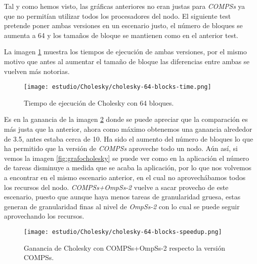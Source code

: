 \par\bigskip

Tal y como hemos visto, las gráficas anteriores no eran justas para \textit{COMPSs} ya que no permitían utilizar todos los procesadores del nodo. El siguiente test pretende poner ambas versiones en un escenario justo, el número de bloques se aumenta a 64 y los tamaños de bloque se mantienen como en el anterior test.
\par\bigskip

La imagen \ref{fig:cholesky-64-time} muestra los tiempos de ejecución de ambas versiones, por el mismo motivo que antes al aumentar el tamaño de bloque las diferencias entre ambas se vuelven más notorias.

\par\bigskip

\begin{figure}[H]
	\centering 
	\caption{Tiempo de ejecución de Cholesky con 64 bloques.}
	\texttt{[image: estudio/Cholesky/cholesky-64-blocks-time.png]}
	\label{fig:cholesky-64-time}
\end{figure}

Es en la ganancia de la imagen \ref{fig:cholesky-64-speedup} donde se puede apreciar que la comparación es más justa que la anterior, ahora como máximo obtenemos una ganancia alrededor de 3.5, antes estaba cerca de 10. Ha sido el aumento del número de bloques lo que ha permitido que la versión de \textit{COMPSs} aproveche todo un nodo. Aún así, si vemos la imagen \ref{fig:grafocholesky} se puede ver como en la aplicación el número de tareas disminuye a medida que se acaba la aplicación, por lo que nos volvemos a encontrar en el mismo escenario anterior, en el cual no aprovechábamos todos los recursos del nodo. \textit{COMPSs+OmpSs-2} vuelve a sacar provecho de este escenario, puesto que aunque haya menos tareas de granularidad gruesa, estas generan de granularidad finas al nivel de \textit{OmpSs-2} con lo cual se puede seguir aprovechando los recursos.

\par\bigskip

\begin{figure}[H]
	\centering 
	\caption{Ganancia de Cholesky con COMPSs+OmpSs-2 respecto la versión COMPSs.}
	\texttt{[image: estudio/Cholesky/cholesky-64-blocks-speedup.png]}
	\label{fig:cholesky-64-speedup}
\end{figure}










